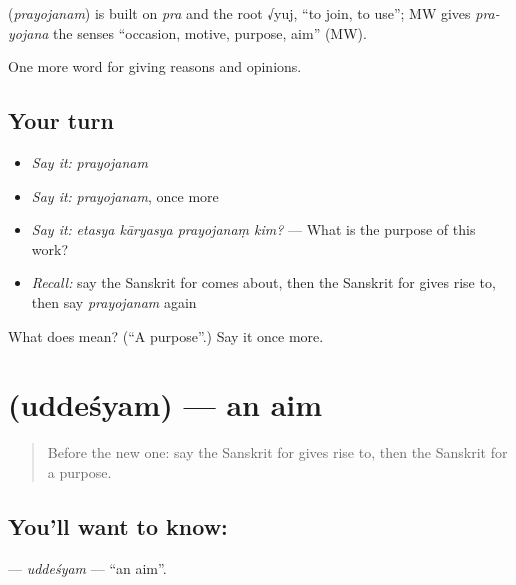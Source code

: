 \begin{cousinweb}
\textbf{} (\emph{prayojanam}) is built on \emph{pra} and the root √yuj, \textquotedblleft{}to join, to use\textquotedblright{}; MW gives \emph{pra-yojana} the senses \textquotedblleft{}occasion, motive, purpose, aim\textquotedblright{} (MW).
\end{cousinweb}

\begin{grammarlens}[title={What you've built}]
One more word for giving reasons and opinions.
\end{grammarlens}

\subsection*{Your turn}
\begin{itemize}
\raggedright
  \item \emph{Say it:} \emph{prayojanam}
  \item \emph{Say it:} \emph{prayojanam}, once more
  \item \emph{Say it:} \emph{etasya kāryasya prayojanaṃ kim?} — What is the purpose of this work?
  \item \emph{Recall:} say the Sanskrit for comes about, then the Sanskrit for gives rise to, then say \emph{prayojanam} again
\end{itemize}

\begin{tcolorbox}[breakable,colback=teal!4,colframe=teal!35!black,title={Before you move on}]
What does  mean? (\textquotedblleft{}A purpose\textquotedblright{}.) Say it once more.
\end{tcolorbox}
\section[\texorpdfstring{\sk{उद्देश्यम्} (uddeśyam)}{उद्देश्यम् (uddeśyam)}]{ (uddeśyam) — an aim}

\label{lesson:SA-C341-uddesyam}



\begin{quote}
Before the new one: say the Sanskrit for gives rise to, then the Sanskrit for a purpose.
\end{quote}

\subsection*{You'll want to know: }
\textbf{} — \emph{uddeśyam} — \textquotedblleft{}an aim\textquotedblright{}.

